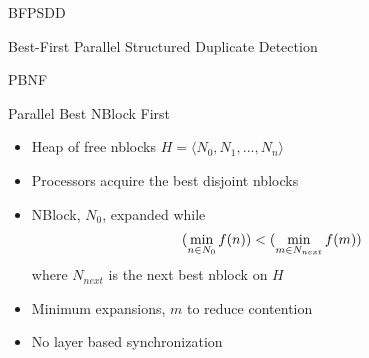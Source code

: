 \documentclass[style=unh]{powerdot}
\begin{document}
\begin{slide}{BFPSDD}
  \vspace{.2in}
  \begin{center}
    Best-First Parallel Structured Duplicate Detection
  \end{center}

\end{slide}


\begin{slide}{PBNF}
  \vspace{.2in}
  \begin{center}
    Parallel Best NBlock First
  \end{center}

  \begin{itemize}
  \item Heap of free nblocks $H = \langle N_0, N_1, ..., N_n \rangle$
  \item Processors acquire the best disjoint nblocks
  \item NBlock, $N_0$, expanded while
    \begin{eqnarray*}
      (\mathop{\rm min}_{n \in N_0} f(n)) < (\mathop{\rm min}_{m \in N_{next}} f(m))
    \end{eqnarray*}
    where $N_{next}$ is the next best nblock on $H$
  \item Minimum expansions, $m$ to reduce contention
  \item No layer based synchronization
  \end{itemize}

\end{slide}

\end{document}
